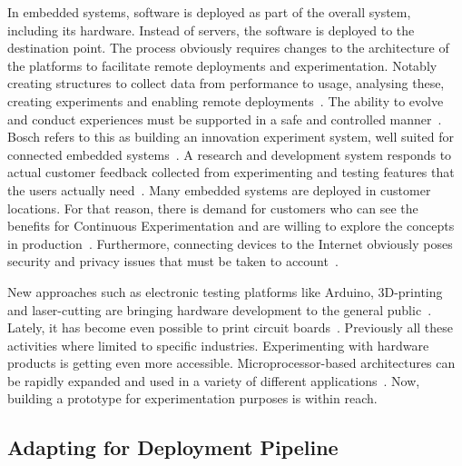 \documentclass[english]{tktltiki2}
\begin{document}
In embedded systems, software is deployed as part of the overall system, including its hardware. Instead of servers, the software is deployed to the destination point. The process obviously requires changes to the architecture of the platforms to facilitate remote deployments and experimentation. Notably creating structures to collect data from performance to usage, analysing these, creating experiments and enabling remote deployments~\cite{BE12}. The ability to evolve and conduct experiences must be supported in a safe and controlled manner~\cite{BE12}. Bosch refers to this as building an innovation experiment system, well suited for connected embedded systems~\cite{BE12, Bos12}. A research and development system responds to actual customer feedback collected from experimenting and testing features that the users actually need~\cite{HAB12}. Many embedded systems are deployed in customer locations. For that reason, there is demand for customers who can see the benefits for Continuous Experimentation and are willing to explore the concepts in production~\cite{HAB12}. Furthermore, connecting devices to the Internet obviously poses security and privacy issues that must be taken to account~\cite{BE12}.

New approaches such as electronic testing platforms like Arduino, 3D-printing and laser-cutting are bringing hardware development to the general public~\cite{Arduino}. Lately, it has become even possible to print circuit boards~\cite{Vol15}. Previously all these activities where limited to specific industries. Experimenting with hardware products is getting even more accessible. Microprocessor-based architectures can be rapidly expanded and used in a variety of different applications~\cite{KRM13}. Now, building a prototype for experimentation purposes is within reach.

\subsection{Adapting for Deployment Pipeline}
\end{document}
